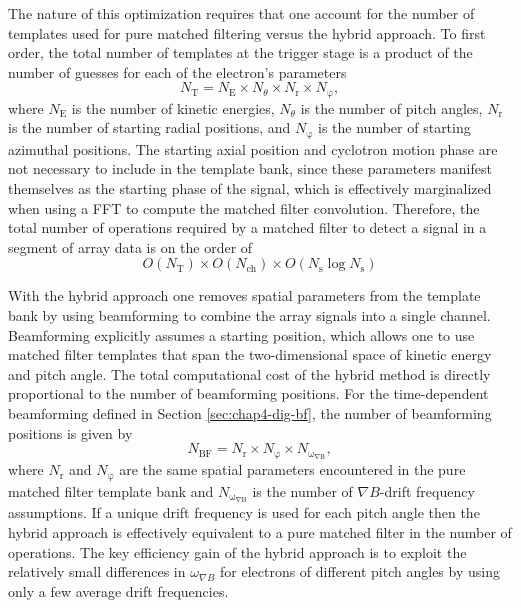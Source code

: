 The nature of this optimization requires that one account for the number of templates used for pure matched filtering versus the hybrid approach. To first order, the total number of templates at the trigger stage is a product of the number of guesses for each of the electron's parameters
\begin{equation}
    N_\mathrm{T}=N_\mathrm{E}\times N_\theta \times N_\mathrm{r} \times N_\mathrm{\varphi},
\end{equation}
where $N_\mathrm{E}$ is the number of kinetic energies, $N_\theta$ is the number of pitch angles, $N_\mathrm{r}$ is the number of starting radial positions, and $N_\mathrm{\varphi}$ is the number of starting azimuthal positions. The starting axial position and cyclotron motion phase are not necessary to include in the template bank, since these parameters manifest themselves as the starting phase of the signal, which is effectively marginalized when using a FFT to compute the matched filter convolution. Therefore, the total number of operations required by a matched filter to detect a signal in a segment of array data is on the order of 
\begin{equation}
    O(N_\mathrm{T})\times O(N_\mathrm{ch})\times O(N_\mathrm{s}\log{N_\mathrm{s}})
    \label{eq:chap4-tot-ops-pure-mf}
\end{equation}

With the hybrid approach one removes spatial parameters from the template bank by using beamforming to combine the array signals into a single channel. Beamforming explicitly assumes a starting position, which allows one to use matched filter templates that span the two-dimensional space of kinetic energy and pitch angle. The total computational cost of the hybrid method is directly proportional to the number of beamforming positions. For the time-dependent beamforming defined in Section \ref{sec:chap4-dig-bf}, the number of beamforming positions is given by 
\begin{equation}
    N_\mathrm{BF}=N_\mathrm{r}\times N_\mathrm{\varphi}\times N_\mathrm{\omega_{\nabla B}},
\end{equation}
where $N_\mathrm{r}$ and $N_\mathrm{\varphi}$ are the same spatial parameters encountered in the pure matched filter template bank and $N_\mathrm{\omega_{\nabla B}}$ is the number of $\nabla B$-drift frequency assumptions. If a unique drift frequency is used for each pitch angle then the hybrid approach is effectively equivalent to a pure matched filter in the number of operations. The key efficiency gain of the hybrid approach is to exploit the relatively small differences in $\omega_{\nabla B}$ for electrons of different pitch angles by using only a few average drift frequencies. 

